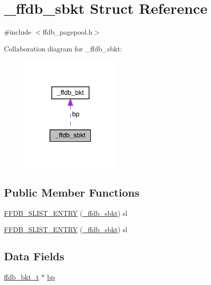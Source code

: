 \hypertarget{struct__ffdb__sbkt}{}\section{\+\_\+ffdb\+\_\+sbkt Struct Reference}
\label{struct__ffdb__sbkt}


{\ttfamily \#include $<$ffdb\+\_\+pagepool.\+h$>$}



Collaboration diagram for \+\_\+ffdb\+\_\+sbkt\+:\nopagebreak
\begin{figure}[H]
\begin{center}
\leavevmode
\includegraphics[width=142pt]{d9/d2f/struct__ffdb__sbkt__coll__graph}
\end{center}
\end{figure}
\subsection*{Public Member Functions}
\begin{DoxyCompactItemize}
\item 
\mbox{\hyperlink{struct__ffdb__sbkt_a63f40d019cc51c813c024f7939999003}{F\+F\+D\+B\+\_\+\+S\+L\+I\+S\+T\+\_\+\+E\+N\+T\+RY}} (\mbox{\hyperlink{struct__ffdb__sbkt}{\+\_\+ffdb\+\_\+sbkt}}) sl
\item 
\mbox{\hyperlink{struct__ffdb__sbkt_a63f40d019cc51c813c024f7939999003}{F\+F\+D\+B\+\_\+\+S\+L\+I\+S\+T\+\_\+\+E\+N\+T\+RY}} (\mbox{\hyperlink{struct__ffdb__sbkt}{\+\_\+ffdb\+\_\+sbkt}}) sl
\end{DoxyCompactItemize}
\subsection*{Data Fields}
\begin{DoxyCompactItemize}
\item 
\mbox{\hyperlink{adat-devel_2other__libs_2filedb_2filehash_2ffdb__pagepool_8h_a7d7436d10d66de8bbe2325c37cd7a5ef}{ffdb\+\_\+bkt\+\_\+t}} $\ast$ \mbox{\hyperlink{struct__ffdb__sbkt_a4c73840977db69d77ee2501433a30df0}{bp}}
\end{DoxyCompactItemize}



